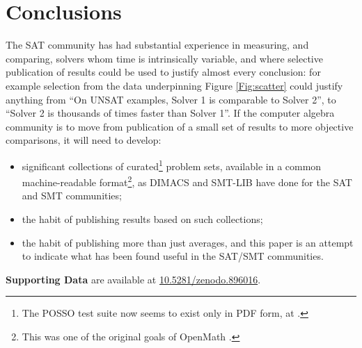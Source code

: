 \documentclass{easychair}
\begin{document}
\section{Conclusions}
The SAT community has had substantial experience in measuring, and comparing, solvers whom time is intrinsically variable, and where selective publication of results could be used to justify almost every conclusion: for example selection from the data underpinning Figure \ref{Fig:scatter} could justify anything from ``On UNSAT examples, Solver 1 is comparable to Solver 2'', to ``Solver 2 is thousands of times faster than Solver 1''. If the computer algebra community is to move from publication of a small set of results to more objective comparisons, it will need to develop:
\begin{itemize}
\item significant collections of curated\footnote{The POSSO test suite now seems to exist only in PDF form, at \cite{BiniMourrain1996}.} problem sets, available in a common machine-readable format\footnote{This was one of the original goals of OpenMath \cite{Abbottetal1996}.}, as DIMACS \cite{Spence2015a} and SMT-LIB \cite{Barrettetal2015b} have done for the SAT and SMT communities;
\item the habit of publishing results based on such collections;
\item the habit of publishing more than just averages, and this paper is an attempt to indicate what has been found useful in the SAT/SMT communities.
\end{itemize}
{\bf Supporting Data} are available at \url{10.5281/zenodo.896016}.

\end{document}
